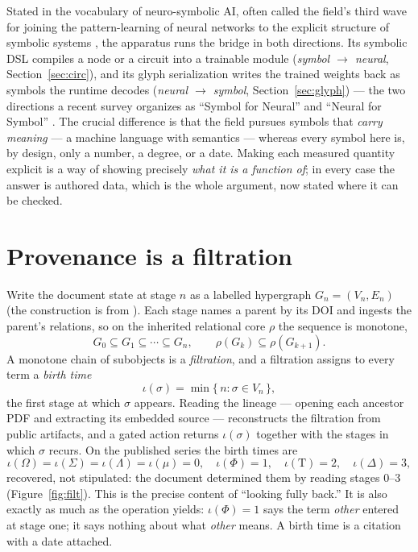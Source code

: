 \documentclass[11pt]{article}
\newcommand{\Tau}{\mathrm{T}}
\begin{document}
Stated in the vocabulary of neuro-symbolic AI, often called the field's third wave
for joining the pattern-learning of neural networks to the explicit structure of
symbolic systems \cite{neurosym}, the apparatus runs the bridge in both
directions. Its symbolic DSL compiles a node or a circuit into a trainable module
(\emph{symbol $\to$ neural}, Section~\ref{sec:circ}), and its glyph serialization
writes the trained weights back as symbols the runtime decodes (\emph{neural $\to$
symbol}, Section~\ref{sec:glyph}) --- the two directions a recent survey organizes
as ``Symbol for Neural'' and ``Neural for Symbol'' \cite{kgns}. The crucial
difference is that the field pursues symbols that \emph{carry meaning} --- a
machine language with semantics \cite{machinelang} --- whereas every symbol here
is, by design, only a number, a degree, or a date. Making each measured quantity
explicit is a way of showing precisely \emph{what it is a function of}; in every
case the answer is authored data, which is the whole argument, now stated where it
can be checked.

\section{Provenance is a filtration}\label{sec:filt}
Write the document state at stage $n$ as a labelled hypergraph $G_n=(V_n,E_n)$
(the construction is from \cite{paper2}). Each stage names a parent by its DOI and
ingests the parent's relations, so on the inherited relational core $\rho$ the
sequence is monotone,
\begin{equation}
G_0\subseteq G_1\subseteq\cdots\subseteq G_n,\qquad \rho(G_k)\subseteq\rho(G_{k+1}).
\end{equation}
A monotone chain of subobjects is a \emph{filtration}, and a filtration assigns to
every term a \emph{birth time}
\begin{equation}
\iota(\sigma)=\min\{\,n:\sigma\in V_n\,\},
\end{equation}
the first stage at which $\sigma$ appears. Reading the lineage --- opening each
ancestor PDF and extracting its embedded source --- reconstructs the filtration
from public artifacts, and a gated action returns $\iota(\sigma)$ together with the
stages in which $\sigma$ recurs. On the published series the birth times are
\begin{equation}
\iota(\Omega)=\iota(\Sigma)=\iota(\Lambda)=\iota(\mu)=0,\quad
\iota(\Phi)=1,\quad\iota(\Tau)=2,\quad\iota(\Delta)=3,
\end{equation}
recovered, not stipulated: the document determined them by reading stages 0--3
(Figure~\ref{fig:filt}). This is the precise content of ``looking fully back.'' It
is also exactly as much as the operation yields: $\iota(\Phi)=1$ says the term
\emph{other} entered at stage one; it says nothing about what \emph{other} means. A
birth time is a citation with a date attached.
\end{document}
